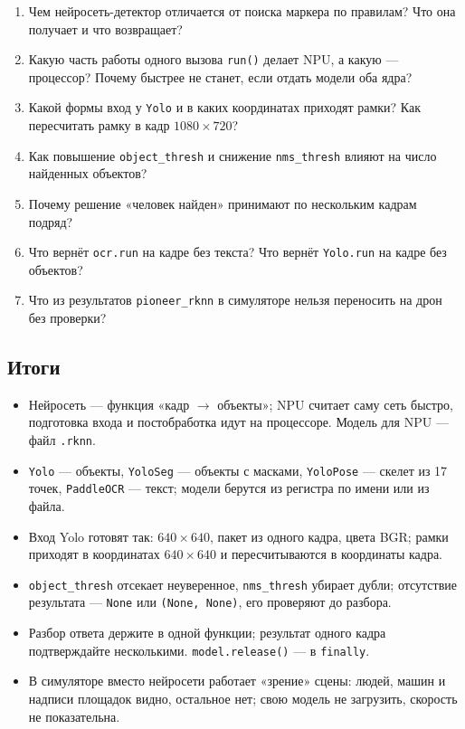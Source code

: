 \begin{questionbox}
\begin{enumerate}
    \item Чем нейросеть-детектор отличается от поиска маркера по правилам? Что она получает и что возвращает?
    \item Какую часть работы одного вызова \verb|run()| делает NPU, а какую --- процессор? Почему быстрее не станет, если отдать модели оба ядра?
    \item Какой формы вход у \texttt{Yolo} и в каких координатах приходят рамки? Как пересчитать рамку в кадр $1080\times720$?
    \item Как повышение \verb|object_thresh| и снижение \verb|nms_thresh| влияют на число найденных объектов?
    \item Почему решение «человек найден» принимают по нескольким кадрам подряд?
    \item Что вернёт \verb|ocr.run| на кадре без текста? Что вернёт \verb|Yolo.run| на кадре без объектов?
    \item Что из результатов \verb|pioneer_rknn| в симуляторе нельзя переносить на дрон без проверки?
\end{enumerate}
\end{questionbox}

\subsection*{Итоги}
\begin{itemize}
    \item Нейросеть --- функция «кадр $\to$ объекты»; NPU считает саму сеть быстро, подготовка входа и постобработка идут на процессоре. Модель для NPU --- файл \texttt{.rknn}.
    \item \verb|Yolo| --- объекты, \verb|YoloSeg| --- объекты с масками, \verb|YoloPose| --- скелет из 17 точек, \verb|PaddleOCR| --- текст; модели берутся из регистра по имени или из файла.
    \item Вход Yolo готовят так: $640\times640$, пакет из одного кадра, цвета BGR; рамки приходят в координатах $640\times640$ и пересчитываются в координаты кадра.
    \item \verb|object_thresh| отсекает неуверенное, \verb|nms_thresh| убирает дубли; отсутствие результата --- \verb|None| или \verb|(None, None)|, его проверяют до разбора.
    \item Разбор ответа держите в одной функции; результат одного кадра подтверждайте несколькими. \verb|model.release()| --- в \verb|finally|.
    \item В симуляторе вместо нейросети работает «зрение» сцены: людей, машин и надписи площадок видно, остальное нет; свою модель не загрузить, скорость не показательна.
\end{itemize}

